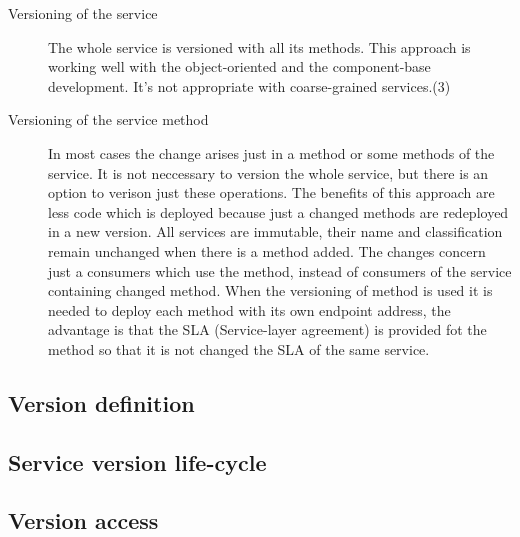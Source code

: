 \begin{description}
  \item[Versioning of the service]
  The whole service is versioned with all its methods. This approach is working well with the object-oriented and the component-base development. It's not appropriate with coarse-grained services.(3)
  \item[Versioning of the service method] 
  In most cases the change arises just in a method or some methods of the service. It is not neccessary to version the whole service, but there is an option to verison just these operations.
  The benefits of this approach are less code which is deployed because just a changed methods are redeployed in a new version. All services are immutable, their name and classification remain unchanged when there is a method added. The changes concern just a consumers which use the method, instead of consumers of the service containing changed method. 
  When the versioning of method is used it is needed to deploy each method with its own endpoint address, the advantage is that the SLA (Service-layer agreement) is provided fot the method so that it is not changed the SLA of the same service.
  
\end{description}

\subsection{Version definition}

\subsection{Service version life-cycle}
\subsection{Version access}







